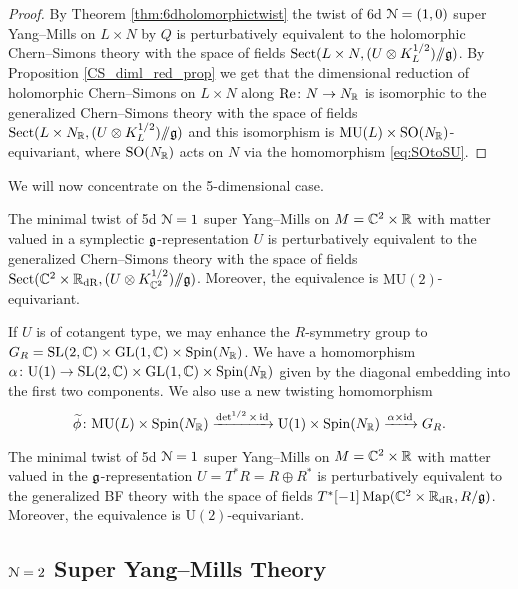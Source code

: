 \documentclass[10pt, oneside]{article}
\newcommand{\MU}{\mathrm{MU}}
\renewcommand{\Re}{\mathrm{Re}}
\newcommand{\Sect}{\mathrm{Sect}}
\renewcommand{\U}{\mathrm{U}}
\newcommand{\ham}{/\!\!/}
\begin{document}
\begin{proof}
By Theorem \ref{thm:6dholomorphictwist} the twist of 6d $\mathcal N=(1, 0)$ super Yang--Mills on $L\times N$ by $Q$ is perturbatively equivalent to the holomorphic Chern--Simons theory with the space of fields $\Sect(L\times N, (U\otimes K_L^{1/2})\ham \fg)$. By Proposition \ref{CS_diml_red_prop} we get that the dimensional reduction of holomorphic Chern--Simons on $L\times N$ along $\Re\colon N\rightarrow N_\RR$ is isomorphic to the generalized Chern--Simons theory with the space of fields $\Sect(L\times N_\RR, (U\otimes K_L^{1/2})\ham\fg)$ and this isomorphism is $\MU(L)\times \SO(N_\RR)$-equivariant, where $\mathrm{SO}(N_\mathbb R)$ acts on $N$ via the homomorphism \eqref{eq:SOtoSU}.
\end{proof}

We will now concentrate on the 5-dimensional case.

\begin{theorem}
The minimal twist of 5d $\mathcal N=1$ super Yang--Mills on $M=\mathbb C^2\times \mathbb R$ with matter valued in a symplectic $\mathfrak g$-representation $U$ is perturbatively equivalent to the generalized Chern--Simons theory with the space of fields $\Sect(\CC^2\times \RR_{\mathrm{dR}}, (U\otimes K_{\CC^2}^{1/2})\ham \fg)$. Moreover, the equivalence is $\MU(2)$-equivariant.
\label{thm:5dminimaltwist}
\end{theorem}

If $U$ is of cotangent type, we may enhance the $R$-symmetry group to $G_R=\mathrm{SL}(2, \mathbb C)\times \mathrm{GL}(1, \mathbb C)\times \mathrm{Spin}(N_\mathbb R)$. We have a homomorphism $\alpha\colon \U(1)\rightarrow \SL(2, \CC)\times \GL(1, \CC)\times \Spin(N_\RR)$ given by the diagonal embedding into the first two components. We also use a new twisting homomorphism
\[\wt\phi\colon \MU(L)\times \Spin(N_\RR)\xrightarrow{\det^{1/2}\times \id}\U(1)\times \Spin(N_\RR)\xrightarrow{\alpha\times\id}G_R.\]

\begin{theorem}
The minimal twist of 5d $\mathcal N=1$ super Yang--Mills on $M=\mathbb C^2\times \mathbb R$ with matter valued in the $\mathfrak g$-representation $U=T^* R=R\oplus R^*$ is perturbatively equivalent to the generalized BF theory with the space of fields $T^*[-1]\operatorname{Map}(\mathbb C^2\times \mathbb R_{\mathrm{dR}}, R/\mathfrak g)$. Moreover, the equivalence is $\U(2)$-equivariant.
\label{thm:5dminimaltwistgraded}
\end{theorem}

\subsection{\texorpdfstring{$\mathcal{N} = 2$}{N=2} Super Yang--Mills Theory} \label{5d_2_section}
\end{document}
